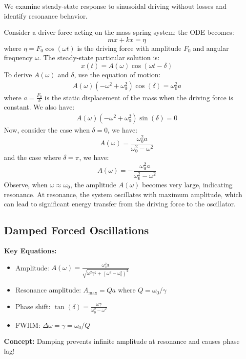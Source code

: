 \documentclass[11pt]{report}
\begin{document}
We examine steady-state response to sinusoidal driving without losses and identify resonance behavior.
\begin{definition}
    Consider a driver force acting on the mass-spring system; the ODE becomes:
    \begin{equation}\label{eq:forced_undamped}
        m\ddot{x} + kx = \eta
    \end{equation}
    where \( \eta = F_0 \cos(\omega t) \) is the driving force with amplitude \( F_0 \) and angular frequency \( \omega \). The steady-state particular solution is:
    \begin{equation}\label{eq:forced_ss}
        x(t) = A(\omega)\cos(\omega t - \delta)
    \end{equation}
    To derive $A(\omega)$ and $\delta$, use the equation of motion:
    \begin{align*}
        A(\omega)(-\omega^2 + \omega_0^2) \cos(\delta) = \omega_0^2 a
    \end{align*}
    where \( a = \frac{F_0}{k} \) is the static displacement of the mass when the driving force is constant. We also have:
    \begin{align*}
        A(\omega)(-\omega^2 + \omega_0^2) \sin(\delta) = 0
    \end{align*}
    Now, consider the case when $\delta = 0$, we have:
    $$
        A(\omega) = \frac{\omega_0^2 a}{\omega_0^2 - \omega^2}
    $$
    and the case where \( \delta = \pi \), we have:
    $$
        A(\omega) = -\frac{\omega_0^2 a}{\omega_0^2 - \omega^2}
    $$
    Observe, when $\omega \approx \omega_0$, the amplitude \( A(\omega) \) becomes very large, indicating resonance. At resonance, the system oscillates with maximum amplitude, which can lead to significant energy transfer from the driving force to the oscillator.
\end{definition}

\subsection{Damped Forced Oscillations}

\begin{keybox}
\textbf{Key Equations:}
\begin{itemize}
    \item Amplitude: $A(\omega) = \frac{\omega_0^2 a}{\sqrt{\omega^2\gamma^2 + (\omega^2 - \omega_0^2)^2}}$
    \item Resonance amplitude: $A_{\text{max}} = Qa$ where $Q = \omega_0/\gamma$
    \item Phase shift: $\tan(\delta) = \frac{\omega\gamma}{\omega_0^2 - \omega^2}$
    \item FWHM: $\Delta\omega = \gamma = \omega_0/Q$
\end{itemize}
\textbf{Concept:} Damping prevents infinite amplitude at resonance and causes phase lag!
\end{keybox}
\end{document}

